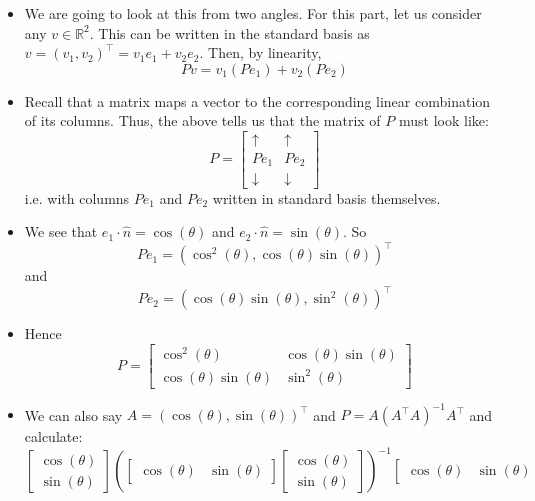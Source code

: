 \documentclass{article}
\begin{document}
\begin{itemize}
    \begin{itemize}
        \item We are going to look at this from two angles. For this part, let us consider any $v \in \mathbb{R}^2$. This can be written in the standard basis as $v = (v_1,v_2)^\top = v_1e_1+v_2e_2$. Then, by linearity,
        \[
        Pv = v_1(Pe_1) + v_2(Pe_2)
        \]
        \item Recall that a matrix maps a vector to the corresponding linear combination of its columns. Thus, the above tells us that the matrix of $P$ must look like:
        \[
        P = \left[ \begin{array}{cc}
            \uparrow & \uparrow \\
            Pe_1 & Pe_2 \\
            \downarrow & \downarrow
        \end{array}\right]
        \]
        i.e. with columns $Pe_1$ and $Pe_2$ written in standard basis themselves.
        \item We see that $e_1 \cdot \hat{n} = \cos(\theta)$ and $e_2 \cdot \hat{n} = \sin(\theta)$. So
        \[
        Pe_1 = (\cos^2(\theta), \cos(\theta)\sin(\theta))^\top
        \]
        and
        \[
        Pe_2 = (\cos(\theta)\sin(\theta),\sin^2(\theta))^\top
        \]
        \item Hence
        \[
        P = \left[ \begin{array}{cc}
            \cos^2(\theta) & \cos(\theta)\sin(\theta) \\
            \cos(\theta)\sin(\theta) & \sin^2(\theta)
        \end{array} \right]
        \]
        \item We can also say $A = (\cos(\theta), \sin(\theta))^\top$ and $P=A(A^\top A)^{-1}A^\top$ and calculate:
        \[
        \left[ \begin{array}{c}
            \cos(\theta) \\ \sin(\theta)
        \end{array}\right] \left( \left[ \begin{array}{cc}
            \cos(\theta) & \sin(\theta)
        \end{array}\right]\left[ \begin{array}{c}
            \cos(\theta) \\ \sin(\theta)
        \end{array}\right] \right)^{-1} \left[ \begin{array}{cc}
            \cos(\theta) & \sin(\theta)

\end{array}\]
\end{itemize}
\end{itemize}
\end{document}
